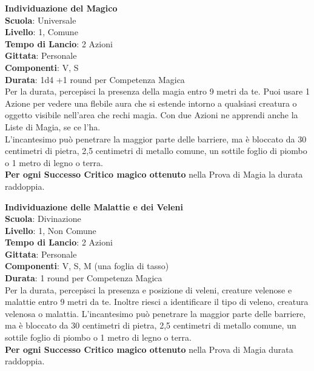 \begin{multicols}{2}
\medskip\textbf{Individuazione del Magico}\\
\textbf{Scuola}: Universale\\
\textbf{Livello}: 1, Comune\\
\textbf{Tempo di Lancio}: 2 Azioni\\
\textbf{Gittata}: Personale\\
\textbf{Componenti}: V, S\\
\textbf{Durata}: 1d4 +1 round per Competenza Magica\\
Per la durata, percepisci la presenza della magia entro 9 metri da te. Puoi usare 1 Azione per vedere una flebile aura che si estende intorno a qualsiasi creatura o oggetto visibile nell'area che rechi magia. Con due Azioni ne apprendi anche la Liste di Magia, se ce l'ha.\\
L'incantesimo può penetrare la maggior parte delle barriere, ma è bloccato da 30 centimetri di pietra, 2,5 centimetri di metallo comune, un sottile foglio di piombo o 1 metro di legno o terra.\\
\textbf{Per ogni Successo Critico magico ottenuto} nella Prova di Magia la durata raddoppia.

\medskip\textbf{Individuazione delle Malattie e dei Veleni}\\
\textbf{Scuola}: Divinazione\\
\textbf{Livello}: 1, Non Comune\\
\textbf{Tempo di Lancio}: 2 Azioni\\
\textbf{Gittata}: Personale\\
\textbf{Componenti}: V, S, M (una foglia di tasso)\\
\textbf{Durata}: 1 round per Competenza Magica\\
Per la durata, percepisci la presenza e posizione di veleni, creature velenose e malattie entro 9 metri da te. Inoltre riesci a identificare il tipo di veleno, creatura velenosa o malattia. L'incantesimo può penetrare la maggior parte delle barriere, ma è bloccato da 30 centimetri di pietra, 2,5 centimetri di metallo comune, un sottile foglio di piombo o 1 metro di legno o terra.\\
\textbf{Per ogni Successo Critico magico ottenuto} nella Prova di Magia durata raddoppia.


\end{multicols}
